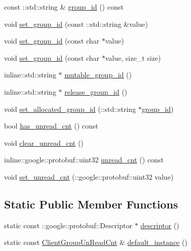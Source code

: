 \begin{DoxyCompactItemize}
\item 
const \+::std\+::string \& \hyperlink{class_i_m_1_1_base_define_1_1_client_group_un_read_cnt_abfba78cb32c895148ec179c6504d75c9}{group\+\_\+id} () const 
\item 
void \hyperlink{class_i_m_1_1_base_define_1_1_client_group_un_read_cnt_ad77dbf9c8bf691269da49a15e7b66eb3}{set\+\_\+group\+\_\+id} (const \+::std\+::string \&value)
\item 
void \hyperlink{class_i_m_1_1_base_define_1_1_client_group_un_read_cnt_afad396b72ee1832a9a00276f7ec1c75c}{set\+\_\+group\+\_\+id} (const char $\ast$value)
\item 
void \hyperlink{class_i_m_1_1_base_define_1_1_client_group_un_read_cnt_aa85a2ce7223e1165c6d0ae0dee7d6cd0}{set\+\_\+group\+\_\+id} (const char $\ast$value, size\+\_\+t size)
\item 
inline\+::std\+::string $\ast$ \hyperlink{class_i_m_1_1_base_define_1_1_client_group_un_read_cnt_a8e2d4d6d62c3b947434f1f5e451d9401}{mutable\+\_\+group\+\_\+id} ()
\item 
inline\+::std\+::string $\ast$ \hyperlink{class_i_m_1_1_base_define_1_1_client_group_un_read_cnt_a413a1c210a0971703b25c82d9c99fcee}{release\+\_\+group\+\_\+id} ()
\item 
void \hyperlink{class_i_m_1_1_base_define_1_1_client_group_un_read_cnt_a58e20cf430367d6b256388b18bbe9243}{set\+\_\+allocated\+\_\+group\+\_\+id} (\+::std\+::string $\ast$\hyperlink{class_i_m_1_1_base_define_1_1_client_group_un_read_cnt_abfba78cb32c895148ec179c6504d75c9}{group\+\_\+id})
\item 
bool \hyperlink{class_i_m_1_1_base_define_1_1_client_group_un_read_cnt_a08cda75149f93d9ee729605c26204918}{has\+\_\+unread\+\_\+cnt} () const 
\item 
void \hyperlink{class_i_m_1_1_base_define_1_1_client_group_un_read_cnt_a152009402b4c7755c7141b1243166a2f}{clear\+\_\+unread\+\_\+cnt} ()
\item 
inline\+::google\+::protobuf\+::uint32 \hyperlink{class_i_m_1_1_base_define_1_1_client_group_un_read_cnt_aa6e48fa0a4dc101aad6513ab860ba93f}{unread\+\_\+cnt} () const 
\item 
void \hyperlink{class_i_m_1_1_base_define_1_1_client_group_un_read_cnt_aeaf46c338dae6da4a45525a86356c4cc}{set\+\_\+unread\+\_\+cnt} (\+::google\+::protobuf\+::uint32 value)
\end{DoxyCompactItemize}
\subsection*{Static Public Member Functions}
\begin{DoxyCompactItemize}
\item 
static const \+::google\+::protobuf\+::\+Descriptor $\ast$ \hyperlink{class_i_m_1_1_base_define_1_1_client_group_un_read_cnt_a16acd26f0ccad0d985b137dc8658fe1b}{descriptor} ()
\item 
static const \hyperlink{class_i_m_1_1_base_define_1_1_client_group_un_read_cnt}{Client\+Group\+Un\+Read\+Cnt} \& \hyperlink{class_i_m_1_1_base_define_1_1_client_group_un_read_cnt_a7c1af6635eb9a8bbf844ccf593aef6d5}{default\+\_\+instance} ()
\end{DoxyCompactItemize}
